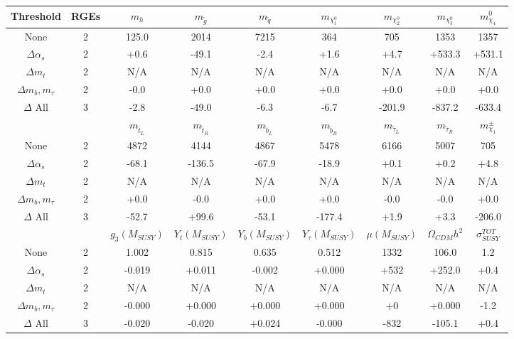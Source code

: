 \begin{table}
\begin{center}
\begin{tabular}{|c|c|ccccccc|}\hline
Threshold & RGEs  & $m_h$  & $m_{\tilde g}$ & $m_{{\tilde q}}$ & $m_{\chi_1^0}$  & $m_{\chi_2^0}$ & $m_{\chi_3^0}$ & $m_{\chi_4}^0$ \\ \hline
None               & 2 & 125.0 & 2014 & 7215 &  364 &  705 & 1353 &1357\\
$\Delta \alpha_s$  & 2 &  +0.6 & -49.1 &  -2.4 &  +1.6 &  +4.7 & +533.3 &+531.1\\
$\Delta m_t$      & 2 & N/A & N/A & N/A & N/A & N/A & N/A & N/A  \\
$\Delta m_b, m_\tau$& 2 &  -0.0 &  +0.0 &  +0.0 &  +0.0 &  +0.0 &  +0.0 & +0.0\\
$\Delta$ All      & 3 &  -2.8 & -49.0 &  -6.3 &  -6.7 & -201.9 & -837.2 &-633.4\\

%
\hline&& $m_{{\tilde t}_L}$  & $m_{{\tilde t}_R}$ &$m_{{\tilde b}_L}$&$m_{{\tilde b}_R}$&$m_{{\tilde \tau}_L}$&$m_{{\tilde \tau}_R}$&$m_{\chi_1}^\pm$ \\ \hline
None             & 2 &4872 & 4144 & 4867 & 5478 & 6166 & 5007 & 705\\
$\Delta \alpha_s$  & 2 & -68.1 & -136.5 & -67.9 & -18.9 &  +0.1 &  +0.2 & +4.8\\
$\Delta m_t$      & 2 & N/A & N/A & N/A & N/A & N/A & N/A & N/A \\
$\Delta m_b, m_\tau$& 2 &  +0.0 &  -0.0 &  +0.0 &  +0.0 &  -0.0 &  -0.0 & +0.0\\
$\Delta$ All      & 3 & -52.7 & +99.6 & -53.1 & -177.4 &  +1.9 &  +3.3 &-206.0\\

%
\hline      &  & $g_3(M_{SUSY})$ & $Y_t(M_{SUSY})$ &  $Y_b(M_{SUSY})$ & $Y_\tau(M_{SUSY})$  & $\mu(M_{SUSY})$    & $\Omega_{CDM} h^2$ & $\sigma_{SUSY}^{TOT}$\\ \hline
 None                   & 2 & 1.002 & 0.815 & 0.635 & 0.512 & 1332 & 106.0 &   1.2\\
$\Delta \alpha_s$  & 2 & -0.019 & +0.011 & -0.002 & +0.000 & +532 & +252.0 &  +0.4\\
$\Delta m_t$      & 2 & N/A & N/A & N/A & N/A & N/A & N/A& N/A\\
$\Delta m_b, m_\tau$& 2 & -0.000 & +0.000 & +0.000 & +0.000 &   +0 & +0.000 &  -1.2\\
$\Delta$ All      & 3 & -0.020 & -0.020 & +0.024 & -0.000 & -832 & -105.1 & +0.4\\


\end{tabular}
\end{center}
\end{table}
